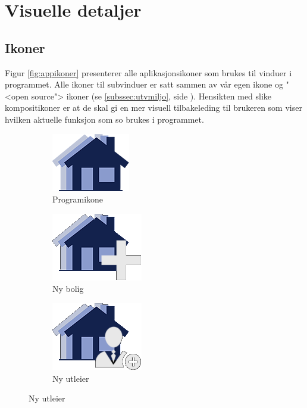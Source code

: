 \section{Visuelle detaljer}


\subsection{Ikoner}
Figur \ref{fig:appikoner} presenterer alle aplikasjonsikoner som brukes til vinduer i programmet. Alle ikoner til subvinduer er satt sammen av vår egen ikone og "<open source"> ikoner (se \ref{subssec:utvmiljo}, side \pageref{subssec:utvmiljo}). Hensikten med slike kompositikoner er at de skal gi en mer visuell tilbakeleding til brukeren som viser hvilken aktuelle funksjon som so brukes i programmet. 

\begin{figure}[ht!]
\centering
\begin{subfigure}[b]{0.2\textwidth}
\centering
\includegraphics[scale=0.4]{./img/produktdokumentasjon/visuelle_detaljer/boligLogo.png}
\caption{Programikone}
\end{subfigure}
\quad
\begin{subfigure}[b]{0.2\textwidth}
\centering
\includegraphics[scale=0.4]{./img/produktdokumentasjon/visuelle_detaljer/ny_bolig.png}
\caption{Ny bolig}
\end{subfigure}
\quad
\begin{subfigure}[b]{0.2\textwidth}
\centering
\includegraphics[scale=0.4]{./img/produktdokumentasjon/visuelle_detaljer/ny_utleier.png}
\caption{Ny utleier}

\end{subfigure}
\end{figure}
